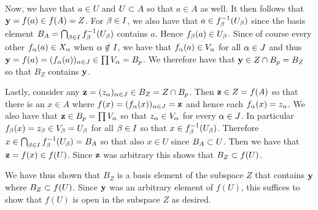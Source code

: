{{    Now, we have that $a \in U$ and $U \ss A$ so that $a \in A$ as well.
    It then follows that $\vy = f(a) \in f(A) = Z$.
    For $\b \in I$, we also have that $a \in \inv{f_\b}(U_\b)$ since the basis element $B_A = \bigcap_{\b \in I} \inv{f_\b}(U_\b)$ contains $a$.
    Hence $f_\b(a) \in U_\b$.
    Since of course every other $f_\a(a) \in X_\a$ when $\a \notin I$, we have that $f_\a(a) \in V_\a$ for all $\a \in J$ and thus $\vy = f(a) = (f_\a(a))_{\a \in J} \in \prod V_\a = B_p$.
    We therefore have that $\vy \in Z \cap B_p = B_Z$ so that $B_Z$ contains $\vy$.

    Lastly, consider any $\vz = (z_\a)_{\a \in J} \in B_Z = Z \cap B_p$.
    Then $\vz \in Z = f(A)$ so that there is an $x \in A$ where $f(x) = (f_\a(x))_{\a \in J} = \vz$ and hence each $f_\a(x) = z_\a$.
    We also have that $\vz \in B_p = \prod V_\a$ so that $z_\a \in V_\a$ for every $\a \in J$.
    In particular $f_\b(x) = z_\b \in V_\b = U_\b$ for all $\b \in I$ so that $x \in \inv{f_\b}(U_\b)$.
    Therefore $x \in \bigcap_{\b \in I} \inv{f_\b}(U_\b) = B_A$ so that also $x \in U$ since $B_A \ss U$.
    Then we have that $\vz = f(x) \in f(U)$.
    Since $\vz$ was arbitrary this shows that $B_Z \ss f(U)$.

    We have thus shown that $B_Z$ is a basis element of the subspace $Z$ that contains $\vy$ where $B_Z \ss f(U)$.
    Since $\vy$ was an arbitrary element of $f(U)$, this suffices to show that $f(U)$ is open in the subspace $Z$ as desired.
  }
}
